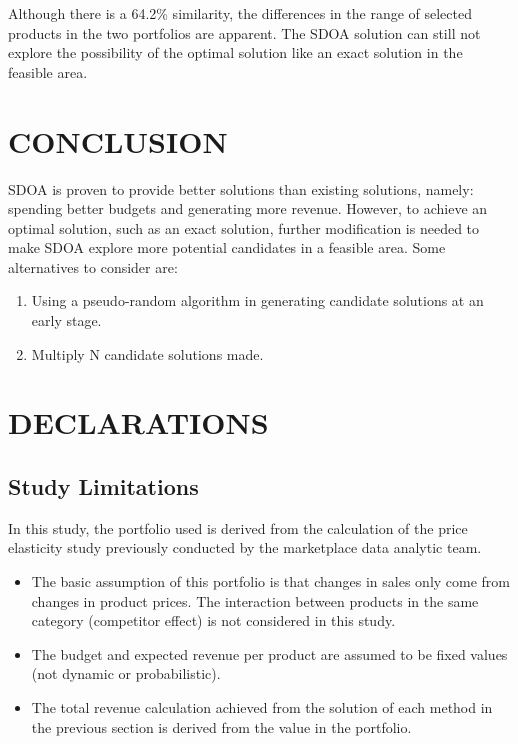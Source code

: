 \documentclass[
]{article}
\providecommand{\tightlist}{%
  \setlength{\itemsep}{0pt}\setlength{\parskip}{0pt}}
\begin{document}
Although there is a 64.2\% similarity, the differences in the range of
selected products in the two portfolios are apparent. The SDOA solution
can still not explore the possibility of the optimal solution like an
exact solution in the feasible area.

\hypertarget{conclusion}{%
\section{CONCLUSION}\label{conclusion}}

SDOA is proven to provide better solutions than existing solutions,
namely: spending better budgets and generating more revenue. However, to
achieve an optimal solution, such as an exact solution, further
modification is needed to make SDOA explore more potential candidates in
a feasible area. Some alternatives to consider are:

\begin{enumerate}
\def\labelenumi{\arabic{enumi}.}
\tightlist
\item
  Using a pseudo-random algorithm in generating candidate solutions at
  an early stage.
\item
  Multiply N candidate solutions made.
\end{enumerate}

\hypertarget{declarations}{%
\section{DECLARATIONS}\label{declarations}}

\hypertarget{study-limitations}{%
\subsection{Study Limitations}\label{study-limitations}}

In this study, the portfolio used is derived from the calculation of the
price elasticity study previously conducted by the marketplace data
analytic team.

\begin{itemize}
\tightlist
\item
  The basic assumption of this portfolio is that changes in sales only
  come from changes in product prices. The interaction between products
  in the same category (competitor effect) is not considered in this
  study.
\item
  The budget and expected revenue per product are assumed to be fixed
  values (not dynamic or probabilistic).
\item
  The total revenue calculation achieved from the solution of each
  method in the previous section is derived from the value in the
  portfolio.
\end{itemize}
\end{document}

